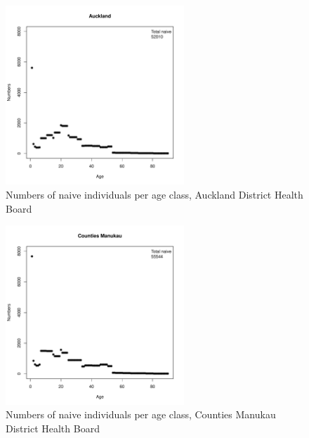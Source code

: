 \documentclass{article}
\begin{document}
\begin{figure}
     \begin{center}
     \includegraphics[width=0.6\textwidth]{dhb3.pdf}
     \end{center}
     \caption{Numbers of naive individuals per age class, Auckland District Health Board}
     \label{fig:Auckland}
\end{figure}

\begin{figure}
     \begin{center}
     \includegraphics[width=0.6\textwidth]{dhb4.pdf}
     \end{center}
     \caption{Numbers of naive individuals per age class, Counties Manukau District Health Board}
     \label{fig:Counties_Manukau}
\end{figure}
\end{document}
